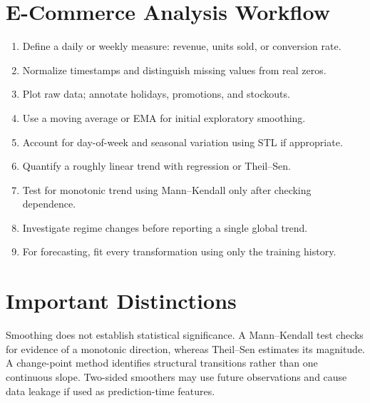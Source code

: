 \documentclass[a4paper]{article}
\begin{document}
\section{E-Commerce Analysis Workflow}
\begin{enumerate}
 \item Define a daily or weekly measure: revenue, units sold, or conversion rate.
 \item Normalize timestamps and distinguish missing values from real zeros.
 \item Plot raw data; annotate holidays, promotions, and stockouts.
 \item Use a moving average or EMA for initial exploratory smoothing.
 \item Account for day-of-week and seasonal variation using STL if appropriate.
 \item Quantify a roughly linear trend with regression or Theil--Sen.
 \item Test for monotonic trend using Mann--Kendall only after checking dependence.
 \item Investigate regime changes before reporting a single global trend.
 \item For forecasting, fit every transformation using only the training history.
\end{enumerate}

\section{Important Distinctions}
Smoothing does not establish statistical significance. A Mann--Kendall test checks for evidence of a monotonic direction, whereas Theil--Sen estimates its magnitude. A change-point method identifies structural transitions rather than one continuous slope. Two-sided smoothers may use future observations and cause data leakage if used as prediction-time features.



\end{document}
